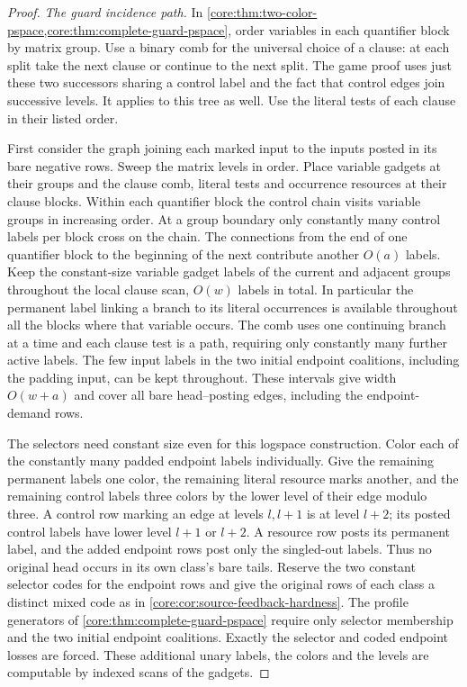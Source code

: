 \begin{proof}
\emph{The guard incidence path.}
In \cref{core:thm:two-color-pspace,core:thm:complete-guard-pspace},
order variables in each quantifier block by matrix group. Use a binary
comb for the universal choice of a clause: at each split take the
next clause or continue to the next split. The game proof uses just
these two successors sharing a control label and the fact that control
edges join successive levels. It applies to this tree as well. Use
the literal tests of each clause in their listed order.

First consider the graph joining each marked input to the inputs
posted in its bare negative rows. Sweep the matrix levels in order.
Place variable gadgets at their groups and the clause comb, literal
tests and occurrence resources at their clause blocks. Within each
quantifier block the control chain visits variable groups in increasing
order. At a group boundary only constantly many control labels per
block cross on the chain. The connections from the end of one
quantifier block to the beginning of the next contribute another
$O(a)$ labels. Keep the constant-size variable gadget labels of the
current and adjacent groups throughout the local clause scan,
$O(w)$ labels in total. In particular the permanent label linking a
branch to its literal occurrences is available throughout all the
blocks where that variable occurs. The comb uses one continuing
branch at a time and each clause test is a path, requiring only
constantly many further active labels. The few input labels in the
two initial endpoint coalitions, including the padding input, can
be kept throughout. These intervals give width $O(w+a)$ and cover
all bare head--posting edges, including the endpoint-demand rows.

The selectors need constant size even for this logspace construction.
Color each of the constantly many padded endpoint labels individually.
Give the remaining permanent labels one color, the remaining literal
resource marks another, and the remaining control labels three colors
by the lower level of their edge modulo three. A control row marking
an edge at levels $l,l+1$ is at level $l+2$; its posted control
labels have lower level $l+1$ or $l+2$. A resource row posts its
permanent label, and the added endpoint rows post only the singled-out
labels. Thus no original head occurs in its own class's bare tails.
Reserve the two constant selector codes for the endpoint rows and
give the original rows of each class a distinct mixed code as in
\cref{core:cor:source-feedback-hardness}. The profile generators of
\cref{core:thm:complete-guard-pspace} require only selector membership
and the two initial endpoint coalitions. Exactly the selector and coded
endpoint losses are forced. These additional unary labels, the colors
and the levels are computable by indexed scans of the gadgets.


\end{proof}
